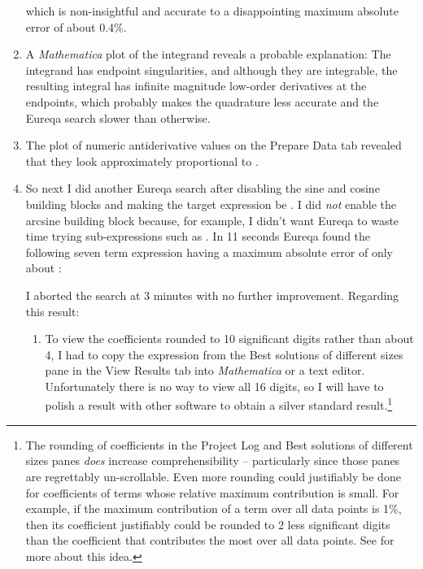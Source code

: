 \documentclass[12pt,english]{article}
\begin{document}
\begin{enumerate}
which is non-insightful and accurate to a disappointing maximum absolute
error of about 0.4\%.\vspace{-5pt}

\item A \textsl{Mathematica} plot of the integrand reveals a probable explanation:
The integrand has endpoint singularities, and although they are integrable,
the resulting integral has infinite magnitude low-order derivatives
at the endpoints, which probably makes the quadrature less accurate
and the Eureqa search slower than otherwise.\vspace{-5pt}

\item The plot of numeric antiderivative values on the \textsf{Prepare Data}
tab revealed that they look approximately proportional to .\vspace{-5pt}

\item So next I did another Eureqa search after disabling the sine and cosine
building blocks and making the target expression be .
I did \textsl{not} enable the arcsine building block because, for
example, I didn't want Eureqa to waste time trying sub-expressions
such as . In 11 seconds Eureqa found the
following seven term expression having a maximum absolute error of
only about :\vspace{-5pt}

I aborted the search at 3 minutes with no further improvement. Regarding
this result:\vspace{-5pt}


\begin{enumerate}
\item To view the coefficients rounded to 10 significant digits rather than
about 4, I had to copy the expression from the \textsf{Best solutions
of different sizes} pane in the \textsf{View Results }tab into \textsl{Mathematica}
or a text editor. Unfortunately there is no way to view all 16 digits,
so I will have to polish a result with other software to obtain a
silver standard result.\footnote{The rounding of coefficients in the \textsf{Project Log} and \textsf{Best
solutions of different sizes} panes \textsl{does} increase comprehensibility
-- particularly since those panes are regrettably un-scrollable. Even
more rounding could justifiably be done for coefficients of terms
whose relative maximum contribution is small. For example, if the
maximum contribution of a term over all data points is 1\%, then its
coefficient justifiably could be rounded to 2 less significant digits
than the coefficient that contributes the most over all data points.
See \cite{RoundingCoefficients} for more about this idea.}\vspace{-3pt}


\end{enumerate}
\end{enumerate}
\end{document}

